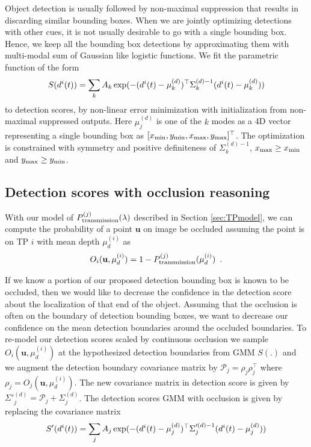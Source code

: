 \documentclass[letterpaper]{report}
\begin{document}
Object detection is usually followed by non-maximal suppression that results in
discarding similar bounding boxes. When we are jointly optimizing detections
with other cues, it is not usually desirable to go with a single bounding box.
Hence, we keep all the bounding box detections by approximating them with
multi-modal sum of Gaussian like logistic functions. We fit the parametric function of the form 
%
\begin{align}
  S(d^{i}(t)) = \sum_k A_k \exp(-(d^{i}(t)-\mu^{(d)}_k)^\top \Sigma^{(d)-1}_k
  (d^{i}(t)-\mu^{(d)}_k))
\end{align}
%
to detection scores, by non-linear error minimization with initialization from
non-maximal suppressed outputs. Here $\mu^{(d)}_j$ is one of the $k$ modes as a
4D vector representing a single bounding box as $[x_{\text{min}}, y_{\text{min}}, x_{\text{max}},
y_{\text{max}}]^\top$. The optimization is constrained with symmetry and positive
definiteness of $\Sigma^{(d)-1}_k$, $x_{\text{max}} \ge x_{\text{min}}$ and $y_{\text{max}} \ge y_{\text{min}}$.

\subsection{Detection scores with occlusion reasoning} 
With our model of $P^{(j)}_{\text{transmission}}(\lambda)$ described in Section \ref{sec:TPmodel}, we can
compute the probability of a point $\mathbf{u}$ on image be occluded assuming
the point is on TP $i$ with mean depth $\mu^{(i)}_d$ as
\begin{align}
  O_{i}(\mathbf{u}, \mu^{(i)}_d) = 1 - P^{(j)}_{\text{transmission}}(\mu^{(i)}_d) \enspace .
\end{align}

If we know a portion of our proposed detection bounding box is known to be
occluded, then we would like to decrease the confidence in the detection score
about the localization of that end of the object. Assuming that the occlusion
is often on the boundary of detection bounding boxes, we want to decrease our
confidence on the mean detection boundaries around the occluded boundaries.
To re-model our detection scores scaled by continuous occlusion we sample
$O_{i}(\mathbf{u}, \mu^{(i)}_d)$ at the hypothesized detection boundaries from
GMM $S(.)$ and we augment the detection boundary covariance matrix by
$\mathcal{P}_{j} = \rho_{j}\rho_{j}^\top$ where $\rho_{j} = O_{j}(\mathbf{u},
\mu^{(i)}_d)$. The new covariance matrix in detection score is given by 
  $\Sigma'^{(d)}_j = \mathcal{P}_{j} + \Sigma^{(d)}_j$.
%
%
The detection scores GMM with occlusion is given by replacing the covariance
matrix
%
\begin{align}
  S'(d^{i}(t)) =
  \sum_j A_j \exp(-(d^{i}(t)-\mu^{(d)}_j)^\top \Sigma'^{(d)-1}_j
  (d^{i}(t)-\mu^{(d)}_j))
\end{align}
\end{document}
